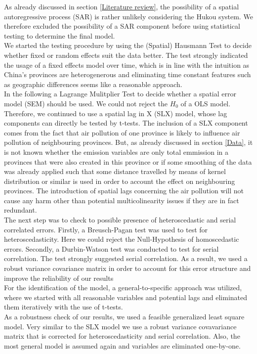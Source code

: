 \documentclass[
]{article}
\begin{document}
	As already discussed in section \ref{Literature review}, the possibility of a spatial autoregressive process (SAR) is rather unlikely considering the Hukou system. We therefore excluded the possibility of a SAR component before using statistical testing to determine the final model.\\
	We started the testing procedure by using the (Spatial) Hausmann Test to decide whether fixed or random effects suit the data better. The test strongly indicated the usage of a fixed effects model over time, which is in line with the intuition as China's provinces are heterogenerous and eliminating time constant features such as geographic differences seems like a reasonable approach.\\
	In the following a Lagrange Mulitplier Test to decide whether a spatial error model (SEM) should be used. We could not reject the $H_0$ of a OLS model. Therefore, we continued to use a spatial lag in X (SLX) model, whose lag components can directly be tested by t-tests. The inclusion of a SLX component comes from the fact that air pollution of one province is likely to influence air pollution of neighbouring provinces. But, as already discussed in section \ref{Data}, it is not known whether the emission variables are only total emmission in a provinces that were also created in this province or if some smoothing of the data was already applied such that some distance travelled by means of kernel distribution or similar is used in order to account the effect on neighbouring provinces. The introduction of spatial lags concerning the air pollution will not cause any harm other than potential multicolinearity issues if they are in fact redundant.\\
	The next step was to check to possible presence of heteroscedastic and serial correlated errors. Firstly, a Breusch-Pagan test was used to test for heteroscedasticity. Here we could reject the Null-Hypothesis of homoscedastic errors. Secondly, a Durbin-Watson test was conducted to test for serial correlation. The test strongly suggested serial correlation. As a result, we used a robust variance covariance matrix in order to account for this error structure and improve the reliability of our results\\
	For the identification of the model, a general-to-specific approach was utilized, where we started with all reasonable variables and potential lags and eliminated them iteratively with the use of t-tests.\\
	As a robustness check of our results, we used a feasible generalized least square model. Very similar to the SLX model we use a robust variance covavariance matrix that is corrected for heteroscedasticity and serial correlation. Also, the most general model is assumed again and variables are eliminated one-by-one.\par
\end{document}
